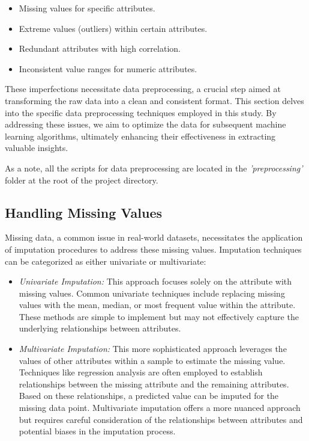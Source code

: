 \documentclass[runningheads]{paper}
\begin{document}
\begin{itemize}
    \item Missing values for specific attributes.
    \item Extreme values (outliers) within certain attributes.
    \item Redundant attributes with high correlation.
    \item Inconsistent value ranges for numeric attributes.
\end{itemize}

These imperfections necessitate data preprocessing, a crucial step aimed at 
transforming the raw data into a clean and consistent format. This section 
delves into the specific data preprocessing techniques employed in this study. 
By addressing these issues, we aim to optimize the data for subsequent machine 
learning algorithms, ultimately enhancing their effectiveness in extracting 
valuable insights. 

As a note, all the scripts for data preprocessing are located in the \textit{'preprocessing'}
folder at the root of the project directory.

\subsection{Handling Missing Values}
Missing data, a common issue in real-world datasets, necessitates the application
of imputation procedures to address these missing values.  Imputation techniques 
can be categorized as either univariate or multivariate:

\begin{itemize}
    \item \textit{Univariate Imputation:} This approach focuses solely on the attribute with missing 
    values. Common univariate techniques include replacing missing values with the 
    mean, median, or most frequent value within the attribute. These methods are 
    simple to implement but may not effectively capture the underlying relationships 
    between attributes.
    \item \textit{Multivariate Imputation:} This more sophisticated approach leverages the values 
    of other attributes within a sample to estimate the missing value. Techniques 
    like regression analysis are often employed to establish relationships between 
    the missing attribute and the remaining attributes. Based on these relationships, 
    a predicted value can be imputed for the missing data point.  Multivariate 
    imputation offers a more nuanced approach but requires careful consideration 
    of the relationships between attributes and potential biases in the imputation 
    process.
\end{itemize}
\end{document}
